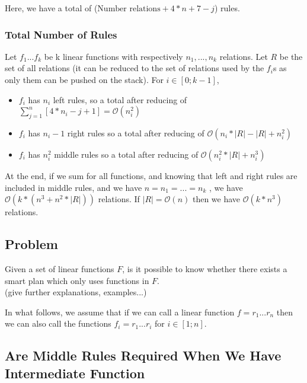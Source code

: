 \documentclass[10pt,a4paper,draft]{article}
\begin{document}
Here, we have a total of ($\textrm{Number relations} + 4 * n + 7 - j$) rules.

\subsubsection{Total Number of Rules}

Let $f_1 ... f_k$ be k linear functions with respectively $n_1, ..., n_k$ relations. Let $R$ be the set of all relations (it can be reduced to the set of relations used by the $f_i$s as only them can be pushed on the stack). For $i \in [0; k-1]$,
\begin{itemize}
\item $f_i$ has $n_i$ left rules, so a total after reducing of $\sum\limits_{j=1}^n [4 * n_i - j + 1] = \mathcal{O}(n_i^2)$
\item $f_i$ has $n_i - 1$ right rules so a total after reducing of $\mathcal{O}(n_i * |R| - |R| + n_i^2)$
\item $f_i$ has $n_i^2$ middle rules so a total after reducing of $\mathcal{O}(n_i^2 * |R| + n_i^3)$
\end{itemize}

At the end, if we sum for all functions, and knowing that left and right rules are included in middle rules, and we have $n = n_1 = ... = n_k$ , we have $\mathcal{O}(k*(n^3 + n^2 * |R|))$ relations. If $|R| = \mathcal{O}(n)$ then we have $\mathcal{O}(k * n^3)$ relations.

\subsection{Problem}

Given a set of linear functions $F$, is it possible to know whether there exists a smart plan which only uses functions in $F$.\\
(give further explanations, examples...)

\begin{Hypothesis}
\label{intermediatefunctions}
In what follows, we assume that if we can call a linear function $f = r_1 ... r_n$ then we can also call the functions $f_i = r_1 ... r_i$ for $i \in [1; n]$.

\end{Hypothesis}

\subsection{Are Middle Rules Required When We Have Intermediate Function}
\end{document}
